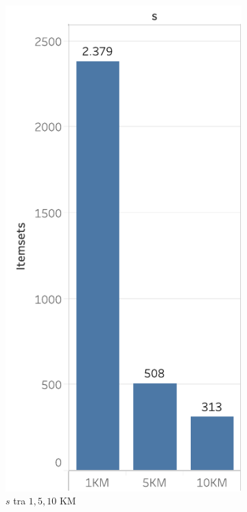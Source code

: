 \begin{figure}
  \centering
  \begin{subfigure}{.5\textwidth}
  \centering
   \includegraphics[scale=0.5]{res/fig/sec-4/itemset/ItemsetS.pdf}
   \caption{\(s\) tra \(1,5,10\) KM}
  \label{fig:chap-4:ItemsetS}
\end{subfigure}%
\begin{subfigure}{.5\textwidth}
  \centering

\end{subfigure}
\end{figure}
